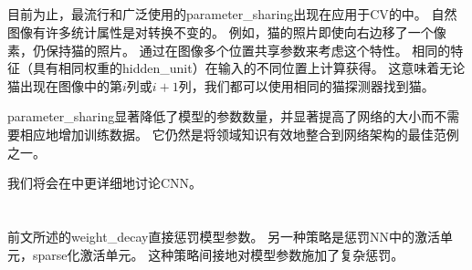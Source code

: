 \subsection{}
目前为止，最流行和广泛使用的\gls{parameter_sharing}出现在应用于\gls{CV}的中。
自然图像有许多统计属性是对转换不变的。
例如，猫的照片即使向右边移了一个像素，仍保持猫的照片。
通过在图像多个位置共享参数来考虑这个特性。
相同的特征（具有相同权重的\gls{hidden_unit}）在输入的不同位置上计算获得。
这意味着无论猫出现在图像中的第$i$列或$i + 1$列，我们都可以使用相同的猫探测器找到猫。

\gls{parameter_sharing}显著降低了模型的参数数量，并显著提高了网络的大小而不需要相应地增加训练数据。
它仍然是将领域知识有效地整合到网络架构的最佳范例之一。

我们将会在中更详细地讨论\gls{CNN}。

\section{}
\label{sec:sparse_representations}
前文所述的\gls{weight_decay}直接惩罚模型参数。
另一种策略是惩罚\gls{NN}中的激活单元，\gls{sparse}化激活单元。
这种策略间接地对模型参数施加了复杂惩罚。

